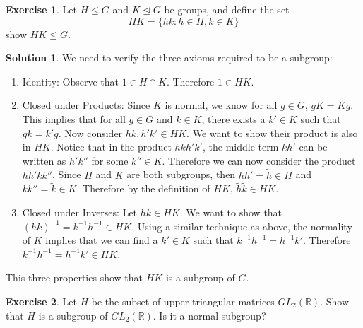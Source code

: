 \documentclass[12pt]{article}
\theoremstyle{definition}
\newtheorem{exercise}{Exercise}
\theoremstyle{definition}
\newtheorem{solution}[theorem]{Solution}
\newcommand{\R}{\mathbb{R}}
\begin{document}
\begin{exercise}
Let $H \leq G$ and $K \trianglelefteq G$ be groups, and define the set
\begin{equation}
	HK = \{ hk : h \in H, k \in K \}
\end{equation}
show $HK \leq G$.
\end{exercise}

\begin{solution}
We need to verify the three axioms required to be a subgroup:
\begin{enumerate}
	\item Identity: Observe that $1 \in H \cap K$. Therefore $1 \in HK$.
	\item Closed under Products: Since $K$ is normal, we know for all $g \in G$, $gK = Kg$. This implies that for all $g \in G$ and $k \in K$, there exists a $k' \in K$ such that $gk = k'g$. Now consider $hk, h'k' \in HK$. We want to show their product is also in $HK$. Notice that in the product $hkh'k'$, the middle term $kh'$ can be written as $h'k''$ for some $k'' \in K$. Therefore we can now consider the product $hh'kk''$. Since $H$ and $K$ are both subgroups, then $hh'=\tilde{h} \in H$ and $kk'' = \tilde{k} \in K$. Therefore by the definition of $HK$, $\tilde{h}\tilde{k} \in HK$. 
	\item Closed under Inverses: Let $hk \in HK$. We want to show that $(hk)^{-1} = k^{-1} h^{-1} \in HK$. Using a similar technique as above, the normality of $K$ implies that we can find a $k' \in K$ such that $k^{-1} h^{-1} = h^{-1} k'$. Therefore $k^{-1} h^{-1} = h^{-1} k' \in HK$.
\end{enumerate}
This three properties show that $HK$ is a subgroup of $G$.
\end{solution}

\begin{exercise}
Let $H$ be the subset of upper-triangular matrices $GL_2(\R)$. Show that $H$ is a subgroup of $GL_2(\R)$. Is it a normal subgroup?
\end{exercise}
\end{document}
